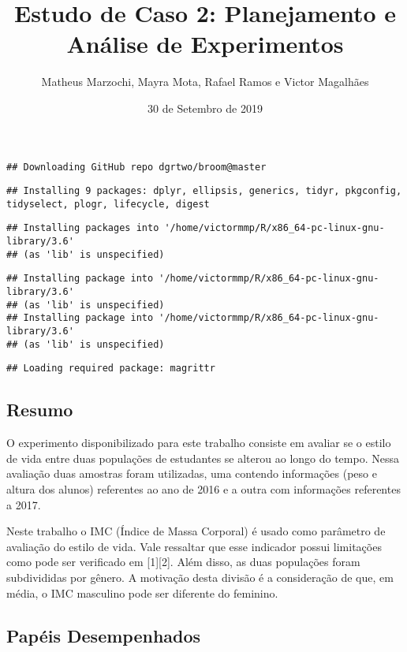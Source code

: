 \documentclass[]{article}
\title{Estudo de Caso 2: Planejamento e Análise de Experimentos}
\author{Matheus Marzochi, Mayra Mota, Rafael Ramos e Victor Magalhães}
\date{30 de Setembro de 2019}
\begin{document}
\maketitle

\begin{verbatim}
## Downloading GitHub repo dgrtwo/broom@master
\end{verbatim}

\begin{verbatim}
## Installing 9 packages: dplyr, ellipsis, generics, tidyr, pkgconfig, tidyselect, plogr, lifecycle, digest
\end{verbatim}

\begin{verbatim}
## Installing packages into '/home/victormmp/R/x86_64-pc-linux-gnu-library/3.6'
## (as 'lib' is unspecified)
\end{verbatim}

\begin{verbatim}
## Installing package into '/home/victormmp/R/x86_64-pc-linux-gnu-library/3.6'
## (as 'lib' is unspecified)
## Installing package into '/home/victormmp/R/x86_64-pc-linux-gnu-library/3.6'
## (as 'lib' is unspecified)
\end{verbatim}

\begin{verbatim}
## Loading required package: magrittr
\end{verbatim}

\hypertarget{resumo}{%
\subsection{Resumo}\label{resumo}}

O experimento disponibilizado para este trabalho consiste em avaliar se
o estilo de vida entre duas populações de estudantes se alterou ao longo
do tempo. Nessa avaliação duas amostras foram utilizadas, uma contendo
informações (peso e altura dos alunos) referentes ao ano de 2016 e a
outra com informações referentes a 2017.

Neste trabalho o IMC (Índice de Massa Corporal) é usado como parâmetro
de avaliação do estilo de vida. Vale ressaltar que esse indicador possui
limitações como pode ser verificado em {[}1{]}{[}2{]}. Além disso, as
duas populações foram subdivididas por gênero. A motivação desta divisão
é a consideração de que, em média, o IMC masculino pode ser diferente do
feminino.

\hypertarget{papeis-desempenhados}{%
\subsection{Papéis Desempenhados}\label{papeis-desempenhados}}
\end{document}
